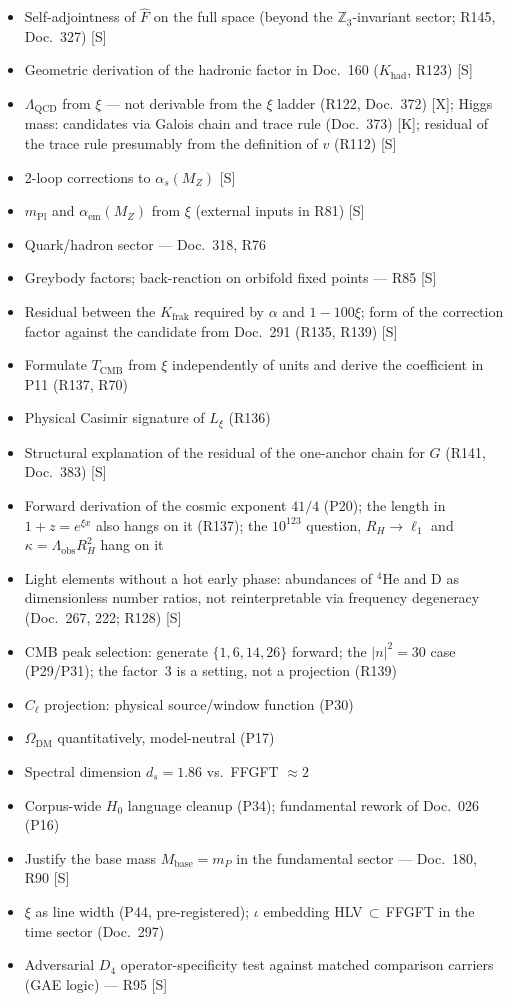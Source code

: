 \begin{itemize}
  \item Self-adjointness of $\hat{F}$ on the full space (beyond the $\mathbb{Z}_3$-invariant sector; R145, Doc.~327) [S]
  \item Geometric derivation of the hadronic factor in Doc.~160 ($K_{\mathrm{had}}$, R123) [S]
  \item $\Lambda_{\mathrm{QCD}}$ from $\xi$ --- not derivable from the $\xi$ ladder (R122, Doc.~372) [X]; Higgs mass: candidates via Galois chain and trace rule (Doc.~373) [K]; residual of the trace rule presumably from the definition of $v$ (R112) [S]
  \item 2-loop corrections to $\alpha_s(M_Z)$ [S]
  \item $m_{\mathrm{Pl}}$ and $\alpha_{\mathrm{em}}(M_Z)$ from $\xi$ (external inputs in R81) [S]
  \item Quark/hadron sector --- Doc.~318, R76
  \item Greybody factors; back-reaction on orbifold fixed points --- R85 [S]
  \item Residual between the $K_{\mathrm{frak}}$ required by $\alpha$ and $1-100\xi$; form of the correction factor against the candidate from Doc.~291 (R135, R139) [S]
  \item Formulate $T_{\mathrm{CMB}}$ from $\xi$ independently of units and derive the coefficient in P11 (R137, R70)
  \item Physical Casimir signature of $L_\xi$ (R136)
  \item Structural explanation of the residual of the one-anchor chain for $G$ (R141, Doc.~383) [S]
  \item Forward derivation of the cosmic exponent $41/4$ (P20); the length in $1+z=e^{\xi x}$ also hangs on it (R137); the $10^{123}$ question, $R_H\to\ell_1$ and $\kappa = \Lambda_{\mathrm{obs}}R_H^2$ hang on it
  \item Light elements without a hot early phase: abundances of $^4$He and D as dimensionless number ratios, not reinterpretable via frequency degeneracy (Doc.~267, 222; R128) [S]
  \item CMB peak selection: generate $\{1,6,14,26\}$ forward; the $|n|^2{=}30$ case (P29/P31); the factor~3 is a setting, not a projection (R139)
  \item $C_\ell$ projection: physical source/window function (P30)
  \item $\Omega_{\mathrm{DM}}$ quantitatively, model-neutral (P17)
  \item Spectral dimension $d_s = 1.86$ vs.\ FFGFT $\approx 2$
  \item Corpus-wide $H_0$ language cleanup (P34); fundamental rework of Doc.~026 (P16)
  \item Justify the base mass $M_\mathrm{base} = m_P$ in the fundamental sector --- Doc.~180, R90 [S]
  \item $\xi$ as line width (P44, pre-registered); $\iota$ embedding HLV$\,\subset\,$FFGFT in the time sector (Doc.~297)
  \item Adversarial $D_4$ operator-specificity test against matched comparison carriers (GAE logic) --- R95 [S]
\end{itemize}
